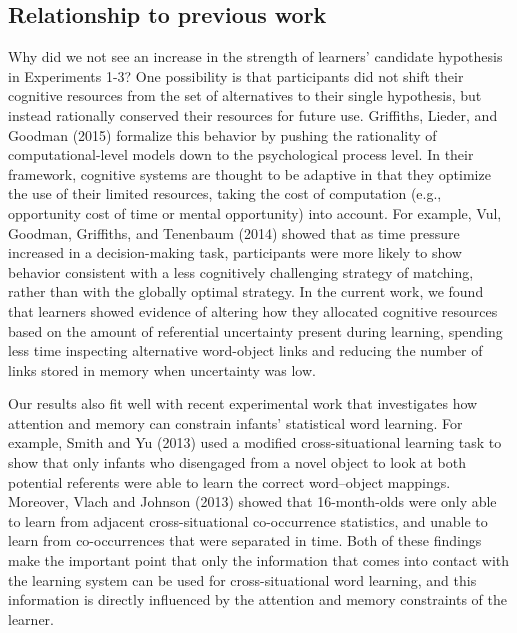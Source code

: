 \documentclass[authoryear, review]{elsarticle}
\begin{document}
\subsection{Relationship to previous
work}\label{relationship-to-previous-work}

Why did we not see an increase in the strength of learners' candidate
hypothesis in Experiments 1-3? One possibility is that participants did
not shift their cognitive resources from the set of alternatives to
their single hypothesis, but instead rationally conserved their
resources for future use. Griffiths, Lieder, and Goodman (2015)
formalize this behavior by pushing the rationality of
computational-level models down to the psychological process level. In
their framework, cognitive systems are thought to be adaptive in that
they optimize the use of their limited resources, taking the cost of
computation (e.g., opportunity cost of time or mental opportunity) into
account. For example, Vul, Goodman, Griffiths, and Tenenbaum (2014)
showed that as time pressure increased in a decision-making task,
participants were more likely to show behavior consistent with a less
cognitively challenging strategy of matching, rather than with the
globally optimal strategy. In the current work, we found that learners
showed evidence of altering how they allocated cognitive resources based
on the amount of referential uncertainty present during learning,
spending less time inspecting alternative word-object links and reducing
the number of links stored in memory when uncertainty was low.

Our results also fit well with recent experimental work that
investigates how attention and memory can constrain infants' statistical
word learning. For example, Smith and Yu (2013) used a modified
cross-situational learning task to show that only infants who disengaged
from a novel object to look at both potential referents were able to
learn the correct word--object mappings. Moreover, Vlach and Johnson
(2013) showed that 16-month-olds were only able to learn from adjacent
cross-situational co-occurrence statistics, and unable to learn from
co-occurrences that were separated in time. Both of these findings make
the important point that only the information that comes into contact
with the learning system can be used for cross-situational word
learning, and this information is directly influenced by the attention
and memory constraints of the learner.
\end{document}
